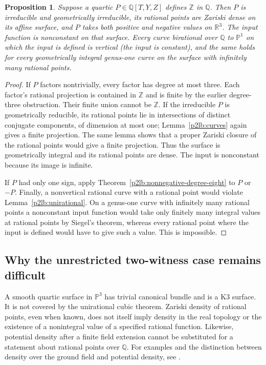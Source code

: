 \documentclass[11pt]{article}
\newtheorem{proposition}[theorem]{Proposition}
\theoremstyle{definition}
\begin{document}
\begin{proposition}\label{p2lb:quartic-surface-necessary}
Suppose a quartic $P\in\mathbb Q[T,Y,Z]$ defines $\mathbb Z$ in
$\mathbb Q$.  Then $P$ is irreducible and geometrically irreducible,
its rational points are Zariski dense on its affine surface, and
$P$ takes both positive and negative values on $\mathbb R^3$.
The input function is nonconstant on that surface.  Every curve
birational over $\mathbb Q$ to $\mathbb P^1$ on which the input is defined is vertical
(the input is constant), and the same holds for every geometrically
integral genus-one curve on the surface with infinitely many rational
points.
\end{proposition}
\begin{proof}
If $P$ factors nontrivially, every factor has degree at most three.
Each factor's rational projection is contained in $\mathbb Z$ and
is finite by the earlier degree-three obstruction.  Their finite
union cannot be $\mathbb Z$.  If the irreducible $P$ is geometrically
reducible, its rational points lie in intersections of distinct
conjugate components, of dimension at most one; Lemma~\ref{p2lb:curves}
again gives a finite projection.  The same lemma shows that a proper
Zariski closure of the rational points would give a finite projection.
Thus the surface is geometrically integral and its rational points
are dense.  The input is nonconstant because its image is infinite.

If $P$ had only one sign, apply
Theorem~\ref{p2lb:nonnegative-degree-eight} to $P$ or $-P$.
Finally, a nonvertical rational curve with a rational point would
violate Lemma~\ref{p2lb:unirational}.  On a genus-one curve with
infinitely many rational points a nonconstant input function would
take only finitely many integral values at rational points by
Siegel's theorem, whereas every rational point where the input is
defined would have to give such a value.  This is impossible.
\end{proof}

\subsection{Why the unrestricted two-witness case remains difficult}

A smooth quartic surface in $\mathbb P^3$ has trivial canonical
bundle and is a K3 surface.  It is not covered by the unirational
cubic theorem.  Zariski density of rational points, even when known,
does not itself imply density in the real topology or the existence
of a nonintegral value of a specified rational function.  Likewise,
potential density after a finite field extension cannot be substituted
for a statement about rational points over $\mathbb Q$.
For examples and the distinction between density over the ground field
and potential density, see \cite{p2lbHarrisTschinkel2000}.
\end{document}
